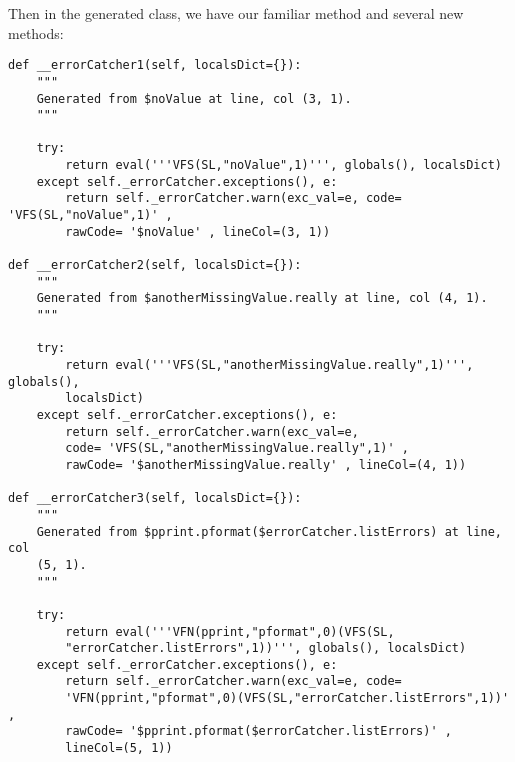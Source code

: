 Then in the generated class, we have our familiar  method
and several new methods:
\begin{verbatim}
def __errorCatcher1(self, localsDict={}):
    """
    Generated from $noValue at line, col (3, 1).
    """

    try:
        return eval('''VFS(SL,"noValue",1)''', globals(), localsDict)
    except self._errorCatcher.exceptions(), e:
        return self._errorCatcher.warn(exc_val=e, code= 'VFS(SL,"noValue",1)' ,
	    rawCode= '$noValue' , lineCol=(3, 1))

def __errorCatcher2(self, localsDict={}):
    """
    Generated from $anotherMissingValue.really at line, col (4, 1).
    """

    try:
        return eval('''VFS(SL,"anotherMissingValue.really",1)''', globals(), 
	    localsDict)
    except self._errorCatcher.exceptions(), e:
        return self._errorCatcher.warn(exc_val=e, 
	    code= 'VFS(SL,"anotherMissingValue.really",1)' , 
	    rawCode= '$anotherMissingValue.really' , lineCol=(4, 1))

def __errorCatcher3(self, localsDict={}):
    """
    Generated from $pprint.pformat($errorCatcher.listErrors) at line, col 
    (5, 1).
    """

    try:
        return eval('''VFN(pprint,"pformat",0)(VFS(SL,
	    "errorCatcher.listErrors",1))''', globals(), localsDict)
    except self._errorCatcher.exceptions(), e:
        return self._errorCatcher.warn(exc_val=e, code= 
	    'VFN(pprint,"pformat",0)(VFS(SL,"errorCatcher.listErrors",1))' , 
	    rawCode= '$pprint.pformat($errorCatcher.listErrors)' , 
	    lineCol=(5, 1))
\end{verbatim}
